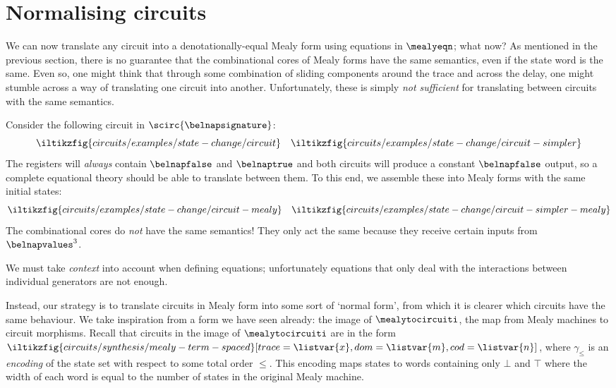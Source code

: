 \section{Normalising circuits}

We can now translate any circuit into a denotationally-equal Mealy form using
equations in \(\mealyeqn\); what now?
As mentioned in the previous section, there is no guarantee that the
combinational cores of Mealy forms have the same semantics, even if the state
word is the same.
Even so, one might think that through some combination of sliding components
around the trace and across the delay, one might stumble across a way of
translating one circuit into another.
Unfortunately, these is simply \emph{not sufficient} for
translating between circuits with the same semantics.

\begin{example}
    Consider the following circuit in \(\scirc{\belnapsignature}\): \[
        \iltikzfig{circuits/examples/state-change/circuit}
        \quad
        \iltikzfig{circuits/examples/state-change/circuit-simpler}
    \]
    The registers will \emph{always} contain
    \(\belnapfalse\) and \(\belnaptrue\) and both circuits will
    produce a constant \(\belnapfalse\) output, so a complete equational theory
    should be able to translate between them.
    To this end, we assemble these into Mealy forms with the same initial states:
    \[
        \iltikzfig{circuits/examples/state-change/circuit-mealy}
        \quad
        \iltikzfig{circuits/examples/state-change/circuit-simpler-mealy}
    \]
    The combinational cores do \emph{not} have the same semantics!
    They only act the same because they receive certain inputs
    from \(\belnapvalues^{3}\).
\end{example}

We must take \emph{context} into account when defining
equations; unfortunately equations that only deal with the interactions between
individual generators are not enough.

Instead, our strategy is to translate circuits in Mealy form into some sort of
`normal form', from which it is clearer which circuits have the same behaviour.
We take inspiration from a form we have seen already: the image of
\(\mealytocircuiti\), the map from Mealy machines to circuit morphisms.
Recall that circuits in the image of \(\mealytocircuiti\) are in the form \(
    \iltikzfig{circuits/synthesis/mealy-term-spaced}[trace=\listvar{x},dom=\listvar{m},cod=\listvar{n}]
\), where \(\gamma_\leq\) is an \emph{encoding} of the state set with respect
to some total order \(\leq\).
This encoding maps states to words containing only \(\bot\) and \(\top\) where
the width of each word is equal to the number of states in the original Mealy
machine.

